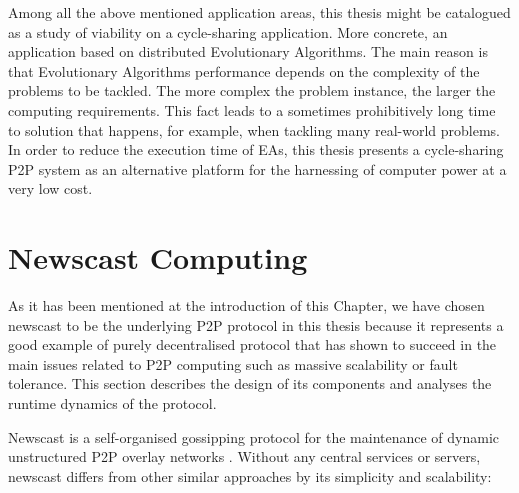 Among all the above mentioned application areas, this thesis might be catalogued as a study of viability on a cycle-sharing application. More concrete, an application based on distributed Evolutionary Algorithms. 
The main reason is that Evolutionary Algorithms performance depends on the complexity of the problems to be tackled. The more complex the problem instance, the larger the computing requirements. This fact leads to a sometimes prohibitively long time to solution that happens, for example, when tackling
many real-world problems. In order to reduce the execution time of EAs, this thesis presents a cycle-sharing P2P system as an alternative platform for the harnessing of computer power at a very low cost.

\clearpage
\section{Newscast Computing}
\label{sec:p2pnewscast}

As it has been mentioned at the introduction of this Chapter, we have chosen newscast to be the underlying P2P protocol in this thesis because it represents a good example of purely decentralised protocol that has shown to succeed in the main issues related to P2P computing such as massive scalability or fault tolerance. This section describes the design of its components and analyses the runtime dynamics of the protocol.

Newscast is a self-organised gossipping protocol for the maintenance of dynamic unstructured P2P
overlay networks \cite{jelasity:newscast}. Without any central services or servers, newscast differs from other similar approaches \cite{gnutella04,chord,can,pastry,tapestry} by its simplicity and scalability:

